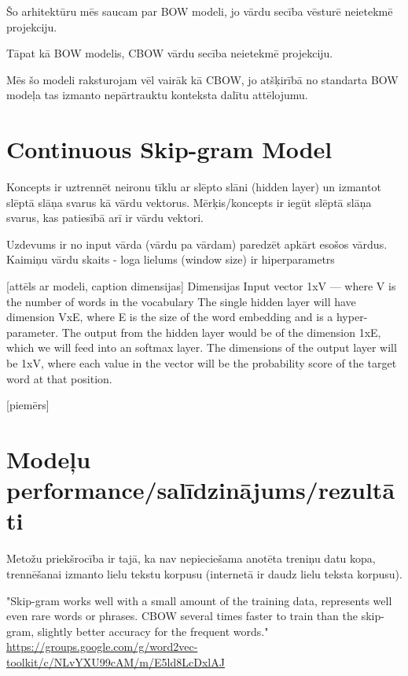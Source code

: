 Šo arhitektūru mēs saucam par BOW modeli, jo vārdu secība vēsturē neietekmē projekciju.

Tāpat kā BOW modelis, CBOW vārdu secība neietekmē projekciju. 

Mēs šo modeli raksturojam vēl vairāk kā CBOW, jo atšķirībā no standarta BOW modeļa tas izmanto nepārtrauktu konteksta dalītu attēlojumu.

\section{Continuous Skip-gram Model}


Koncepts ir uztrennēt neironu tīklu ar slēpto slāni (hidden layer) un izmantot slēptā slāņa svarus kā vārdu vektorus.
Mērķis/koncepts ir iegūt slēptā slāņa svarus, kas patiesībā arī ir vārdu vektori.

Uzdevums ir no input vārda (vārdu pa vārdam) paredzēt apkārt esošos vārdus. Kaimiņu vārdu skaits - loga lielums (window size) ir hiperparametrs

[attēls ar modeli, caption dimensijas]
Dimensijas
Input vector 1xV — where V is the number of words in the vocabulary
The single hidden layer will have dimension VxE, where E is the size of the word embedding and is a hyper-parameter.
The output from the hidden layer would be of the dimension 1xE, which we will feed into an softmax layer.
The dimensions of the output layer will be 1xV, where each value in the vector will be the probability score of the target word at that position.

[piemērs]


\cite{mccormick2016}


\section{Modeļu performance/salīdzinājums/rezultāti}

Metožu priekšrocība ir tajā, ka nav nepieciešama anotēta treniņu datu kopa, trennēšanai izmanto lielu tekstu korpusu (internetā ir daudz lielu teksta korpusu).


"Skip-gram works well with a small amount of the training data, represents well even rare words or phrases.
CBOW several times faster to train than the skip-gram, slightly better accuracy for the frequent words." 
\url{https://groups.google.com/g/word2vec-toolkit/c/NLvYXU99cAM/m/E5ld8LcDxlAJ}
